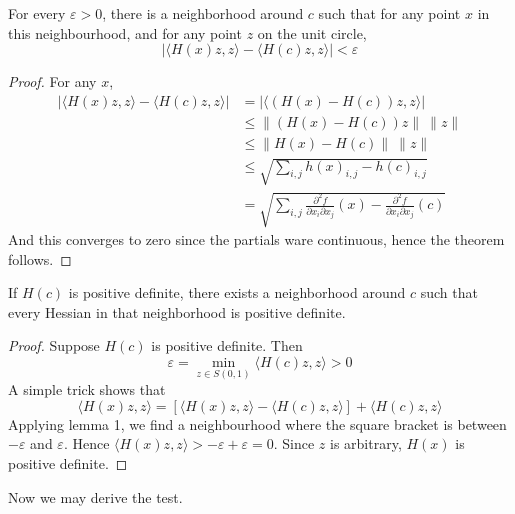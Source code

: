 \begin{lemma}
    For every $\varepsilon > 0$, there is a neighborhood around $c$ such that for any point $x$ in this neighbourhood, and for any point $z$ on the unit circle,
    \[ | \langle H(x)z,z \rangle - \langle H(c)z, z \rangle| < \varepsilon \]
\end{lemma}
%
\begin{proof}
    For any $x$,
    \begin{align*}
        |\langle H(x)z, z \rangle - \langle H(c)z, z \rangle | &= | \langle (H(x) - H(c))z, z \rangle |\\
        &\leq  \| (H(x) - H(c)) z \|\ \| z \|\\
        &\leq \|H(x) - H(c)\|\ \|z\|\\
        &\leq \sqrt{ \sum_{i,j} h(x)_{i,j} - h(c)_{i,j}}\\
        &= \sqrt{ \sum_{i,j} \frac{\partial^2 f}{\partial x_i \partial x_j} (x) - \frac{\partial^2 f}{\partial x_i \partial x_j} (c) }
    \end{align*}
    And this converges to zero since the partials ware continuous, hence the theorem follows.
\end{proof}

\begin{lemma}
    If $H(c)$ is positive definite, there exists a neighborhood around $c$ such that every Hessian in that neighborhood is positive definite.
\end{lemma}
%
\begin{proof}
    Suppose $H(c)$ is positive definite. Then 
    \[ \varepsilon = \min_{z \in S(0,1)} \langle H(c)z, z \rangle > 0 \]
    A simple trick shows that
    \[ \langle H(x)z, z \rangle = [\langle H(x)z, z \rangle - \langle H(c)z, z \rangle] + \langle H(c)z, z \rangle \]
    Applying lemma 1, we find a neighbourhood where the square bracket is between $-\varepsilon$ and $\varepsilon$. Hence $\langle H(x)z, z \rangle > -\varepsilon + \varepsilon = 0$. Since $z$ is arbitrary, $H(x)$ is positive definite.
\end{proof}

Now we may derive the test.

